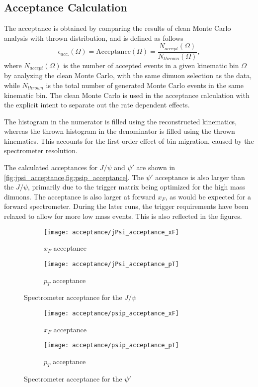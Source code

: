 \documentclass[../main.tex]{subfiles}
\begin{document}
\subsection{Acceptance Calculation}
The acceptance is obtained by comparing the results of clean Monte Carlo analysis with thrown distribution,
and is defined as follows
\begin{equation}
	\epsilon_{acc.}\left(\Omega\right)=\mathrm{Acceptance}\left(\Omega\right)= \frac{N_{accept}\left(\Omega\right)}{N_{thrown}\left(\Omega\right)},
\end{equation}
where $N_{accept}\left(\Omega\right)$ is the number of accepted events in a given kinematic bin $\Omega$
by analyzing the clean Monte Carlo, with the same dimuon selection
as the data, while $N_{thrown}$ is the total number of generated Monte Carlo events in the same kinematic bin.
The clean Monte Carlo is used in the acceptance calculation with the explicit intent to separate out the
rate dependent effects.

The histogram in the numerator is filled using the reconstructed kinematics, whereas
the thrown histogram in the denominator is filled using the thrown kinematics. This accounts for
the first order effect of bin migration, caused by the spectrometer resolution.


The calculated acceptances for $J/\psi$ and $\psi'$ are shown in \cref{fig:jpsi_acceptance,fig:psip_acceptance}.
The $\psi'$ acceptance is also larger than the $J/\psi$, primarily due to the
trigger matrix being optimized for the high mass dimuons. The acceptance is also larger at forward $x_F$,
as would be expected for a forward spectrometer.
During the later runs, the trigger requirements have been relaxed to allow for more low mass events.
This is also reflected in the figures.
\begin{figure}[h!]
	\centering
	\begin{subfigure}{0.45\linewidth}
		\texttt{[image: acceptance/jPsi\_acceptance\_xF]}
		\caption{$x_F$ acceptance}
	\end{subfigure}
	\begin{subfigure}{0.45\linewidth}
		\texttt{[image: acceptance/jPsi\_acceptance\_pT]}
		\caption{$p_T$ acceptance}
	\end{subfigure}
	\caption{Spectrometer acceptance for the $J/\psi$}
	\label{fig:jpsi_acceptance}
\end{figure}
\begin{figure}[h!]
	\centering
	\begin{subfigure}{0.45\linewidth}
		\texttt{[image: acceptance/psip\_acceptance\_xF]}
		\caption{$x_F$ acceptance}
	\end{subfigure}
	\begin{subfigure}{0.45\linewidth}
		\texttt{[image: acceptance/psip\_acceptance\_pT]}
		\caption{$p_T$ acceptance}
	\end{subfigure}
	\caption{Spectrometer acceptance for the $\psi'$}
	\label{fig:psip_acceptance}
\end{figure}
\end{document}
